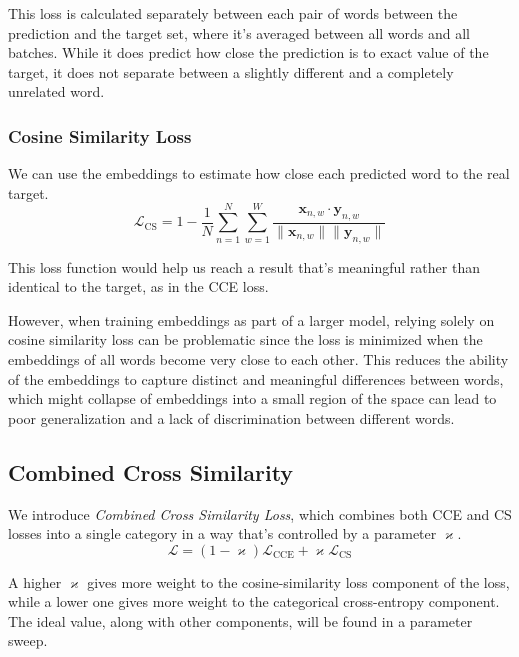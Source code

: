 This loss is calculated separately between each pair of words between the prediction and the target set, where it's averaged between all words and all batches.
While it does predict how close the prediction is to exact value of the target, it does not separate between a slightly different and a completely unrelated word.

\subsubsection{Cosine Similarity Loss}
\label{cosine_similarity_loss}

We can use the embeddings to estimate how close each predicted word to the real target\cite{cosineSimilarity}.
\begin{equation}
	\mathcal{L}_\text{CS} = 1 - \frac{1}{N} \sum_{n=1}^{N} \sum^W_{w = 1} \frac{\mathbf{x}_{n,w} \cdot \mathbf{y}_{n,w}}{\|\mathbf{x}_{n,w}\| \|\mathbf{y}_{n, w}\|}	
\end{equation}

This loss function would help us reach a result that's meaningful rather than identical to the target, as in the CCE loss.

However, when training embeddings as part of a larger model, relying solely on cosine similarity loss can be problematic since the loss is minimized when the embeddings of all words become very close to each other.
This reduces the ability of the embeddings to capture distinct and meaningful differences between words, which might collapse of embeddings into a small region of the space can lead to poor generalization and a lack of discrimination between different words.

\subsection{Combined Cross Similarity}
We introduce \emph{Combined Cross Similarity Loss}, which combines both CCE and CS losses into a single category in a way that's controlled by a parameter $\varkappa$.
\begin{equation}
    \mathcal{L} = (1 - \varkappa) \mathcal{L}_{\text{CCE}} + \varkappa \mathcal{L}_{\text{CS}}
\end{equation}

A higher $\varkappa$ gives more weight to the cosine-similarity loss component of the loss, while a lower one gives more weight to the categorical cross-entropy component.
The ideal value, along with other components, will be found in a parameter sweep.

